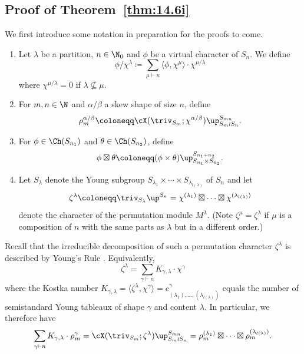 \subsection{Proof of Theorem~\ref{thm:14.6i}}\label{sec:16}
We first introduce some notation in preparation for the proofs to come.
\begin{notation}\label{not:rho}
	\begin{enumerate}[label=\textup{(\roman*)}]
		\item \label{561} Let $\lambda$ be a partition, $n\in\N_0$ and $\phi$ be a virtual character of $S_n$.
		We define
		\[ \phi/\chi^\lambda\coloneqq  \sum_{\mu\vdash n}\langle \phi,\chi^\mu\rangle\cdot\chi^{\mu/\lambda} \]
		where $\chi^{\mu/\lambda}=0$ if $\lambda\not\subseteq\mu$.
		
		\item \label{562} For $m,n\in\N$ and $\alpha/\beta$ a skew shape of size $n$, define \[
		\rho^{\alpha/\beta}_m \coloneqq  \cX(\triv_{S_m};\chi^{\alpha/\beta})\up_{S_m\wr S_n}^{S_{mn}}.\] 
		
		\item \label{563} For $\phi\in\Ch(S_{n_1})$ and $\theta\in\Ch(S_{n_2})$, define
		\[ \phi\boxtimes\theta\coloneqq  (\phi\times\theta)\up_{S_{n_1}\times S_{n_2}}^{S_{n_1+n_2}}. \]
		
		\item \label{564} Let $S_\lambda$ denote the Young subgroup $S_{\lambda_1}\times\cdots\times S_{\lambda_{l(\lambda)}}$ of $S_n$ and let
		\[ \zeta^\lambda\coloneqq \triv_{S_\lambda}\up^{S_n} = \chi^{(\lambda_1)}\boxtimes\cdots\boxtimes \chi^{(\lambda_{l(\lambda)})} \]
		denote the character of the permutation module $M^\lambda$. (Note $\zeta^\mu=\zeta^\lambda$ if $\mu$ is a composition of $n$ with the same parts as $\lambda$ but in a different order.) 
	\end{enumerate}
\end{notation}

Recall that the irreducible decomposition of such a permutation character $\zeta^\lambda$ is described by Young's Rule \cite[2.8.5]{JK}. Equivalently,
\begin{equation}\label{eqn:kostka}
	\zeta^\lambda = \sum_{\gamma\vdash n} K_{\gamma,\lambda}\cdot \chi^\gamma
\end{equation}
where the Kostka number $K_{\gamma,\lambda} = \langle \zeta^\lambda,\chi^\gamma\rangle=c^\gamma_{(\lambda_1),\dotsc,(\lambda_{l(\lambda)})}$ equals the number of semistandard Young tableaux of shape $\gamma$ and content $\lambda$.
In particular, we therefore have
\begin{equation}\label{eqn:15.2}
	\sum_{\gamma\vdash n} K_{\gamma,\lambda}\cdot \rho^\gamma_m = \cX(\triv_{S_m}; \zeta^\lambda)\up_{S_m\wr S_n}^{S_{mn}} = \rho^{(\lambda_1)}_m\boxtimes\cdots\boxtimes\rho^{(\lambda_{l(\lambda)})}_m.
\end{equation}

